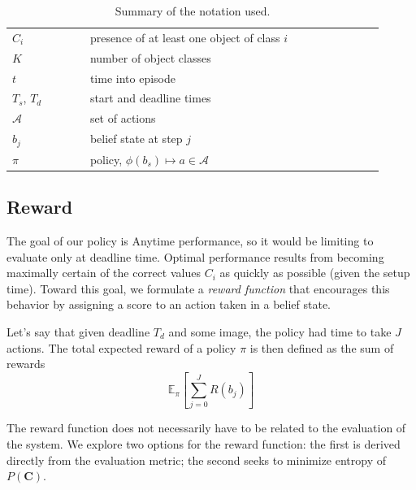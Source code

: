 \documentclass[runningheads]{llncs}
\begin{document}
\begin{table}
\centering
\caption{Summary of the notation used.}
\label{tab:notation}
\begin{tabular}{|l|l|}
	\hline
	$C_i$         & presence of at least one object of class $i$  \\ 
	$K$           & number of object classes                      \\ 
	$t$           & time into episode                             \\ 
	$T_s$, $T_d$  & start and deadline times                      \\ 
	$\mathcal{A}$ & set of actions                                \\ 
	$b_j$        	& belief state at step $j$                                 \\ 
	$\pi$         & policy, $\phi(b_s) \mapsto a \in \mathcal{A}$ \\ 
	\hline
\end{tabular}\end{table}

\subsection{Reward} \label{sec:reward}
The goal of our policy is Anytime performance, so it would be limiting to evaluate only at deadline time.
Optimal performance results from becoming maximally certain of the correct values $C_i$ as quickly as possible (given the setup time).
Toward this goal, we formulate a \emph{reward function} that encourages this behavior by assigning a score to an action taken in a belief state.

Let's say that given deadline $T_d$ and some image, the policy had time to take $J$ actions.
The total expected reward of a policy $\pi$ is then defined as the sum of rewards
\begin{equation}
\mathbb{E}_\pi[\sum_{j=0}^J R(b_j)]
\end{equation}

The reward function does not necessarily have to be related to the evaluation of the system.
We explore two options for the reward function: the first is derived directly from the evaluation metric; the second seeks to minimize entropy of $P(\mathbf{C})$.
\end{document}
